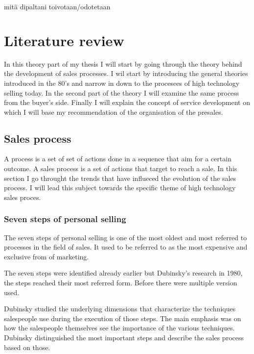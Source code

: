 \documentclass[12pt,a4paper,oneside,pdftex]{report}
\begin{document}
mitä dipaltani toivotaan/odotetaan

% 

\chapter{Literature review}
\label{chapter:Theory}


In this theory part of my thesis I will start by going through the theory behind the development of sales processes. I wil start by introducing the general theories introduced in the 80's and narrow in down to the procesees of high technology selling today. 
In the second part of the theory I will examine the same process from the buyer's side. 
Finally I will explain the concept of service development on which I will base my recommendation of the organisation of the presales. 


\section{Sales process}
\label{sec:environments}
A process is a set of set of actions done in a sequence that aim for a certain outcome. A sales process is a set of actions that target to reach a sale. In this section I go throught the trends that have influeced the evolution of the sales process. I will lead this subject towards the specific theme of high technology sales proces.  


\subsection{Seven steps of personal selling}

The seven steps of personal selling is one of the most oldest and most referred to processes in the field of sales. It used to be referred to as the most expensive and exclusive from of marketing. 

The seven steps were identified already earlier but Dubinsky's research in 1980, the steps reached their most referred form. Before there were multiple version used. 

Dubinsky studied the underlying dimensions that characterize the techniques salespeople use during the execution of those steps. The main emphasis was on how the salespeople themselves see the importance of the various techniques. Dubinsky distinguished the most important steps and describe the sales process based on those. 
\end{document}
